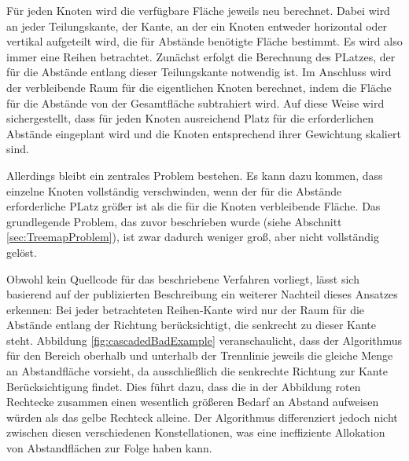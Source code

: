 Für jeden Knoten wird die verfügbare Fläche jeweils neu berechnet. Dabei wird an jeder Teilungskante, der Kante, an der ein Knoten entweder horizontal oder vertikal aufgeteilt wird, die für Abstände benötigte Fläche bestimmt. Es wird also immer eine Reihen betrachtet. Zunächst erfolgt die Berechnung des PLatzes, der für die Abstände entlang dieser Teilungskante notwendig ist. Im Anschluss wird der verbleibende Raum für die eigentlichen Knoten berechnet, indem die Fläche für die Abstände von der Gesamtfläche subtrahiert wird. Auf diese Weise wird sichergestellt, dass für jeden Knoten ausreichend Platz für die erforderlichen Abstände eingeplant wird und die Knoten entsprechend ihrer Gewichtung skaliert sind. 

Allerdings bleibt ein zentrales Problem bestehen. Es kann dazu kommen, dass einzelne Knoten vollständig verschwinden, wenn der für die Abstände erforderliche PLatz größer ist als die für die Knoten verbleibende Fläche.
Das grundlegende Problem, das zuvor beschrieben wurde (siehe Abschnitt \ref{sec:TreemapProblem}), ist zwar dadurch weniger groß, aber nicht vollständig gelöst.

Obwohl kein Quellcode für das beschriebene Verfahren vorliegt, lässt sich basierend auf der publizierten Beschreibung ein weiterer Nachteil dieses Ansatzes erkennen: Bei jeder betrachteten Reihen-Kante wird nur der Raum für die Abstände entlang der Richtung berücksichtigt, die senkrecht zu dieser Kante steht. Abbildung \ref{fig:cascadedBadExample} veranschaulicht, dass der Algorithmus für den Bereich oberhalb und unterhalb der Trennlinie jeweils die gleiche Menge an Abstandfläche vorsieht, da ausschließlich die senkrechte Richtung zur Kante Berücksichtigung findet. Dies führt dazu, dass die in der Abbildung roten Rechtecke zusammen einen wesentlich größeren Bedarf an Abstand aufweisen würden als das gelbe Rechteck alleine. Der Algorithmus differenziert jedoch nicht zwischen diesen verschiedenen Konstellationen, was eine ineffiziente Allokation von Abstandflächen zur Folge haben kann.

